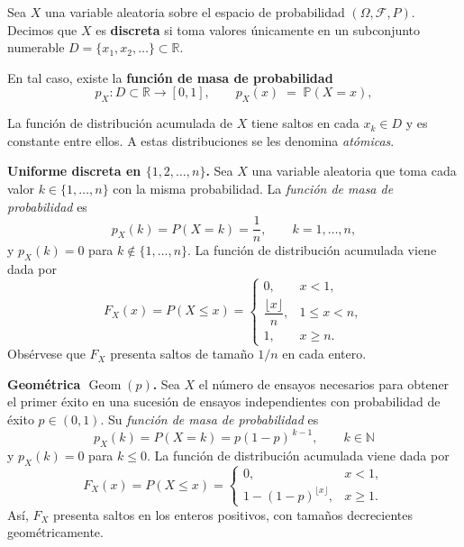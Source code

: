 \documentclass[../Main.tex]{subfiles}
\begin{document}
\begin{definition}{}{}
Sea $X$ una variable aleatoria sobre el espacio de probabilidad
$(\Omega,\mathcal F,P)$.
Decimos que $X$ es \textbf{discreta} si toma valores únicamente en un
subconjunto numerable $D=\{x_1,x_2,\dots\}\subset\mathbb R$.

En tal caso, existe la \textbf{función de masa de probabilidad}
\[
    p_X:D\subset\mathbb R\longrightarrow[0,1],
    \qquad
    p_X(x)\;=\;\mathbb{P}(X=x),
\]

\end{definition}
\begin{remark}{}{}
La función de distribución acumulada de $X$ tiene saltos en cada $x_k\in D$ y es constante entre ellos.  A estas distribuciones se les denomina \emph{atómicas}.
\end{remark}
\begin{example}{}{}
\textbf{Uniforme discreta en \(\{1,2,\dots,n\}\).}\;
Sea \(X\) una variable aleatoria que toma cada valor
\(k\in\{1,\dots,n\}\) con la misma probabilidad.
La \emph{función de masa de probabilidad} es  
\[
    p_X(k)=P(X=k)=\frac{1}{n},
    \qquad k=1,\dots,n,
\]
y \(p_X(k)=0\) para \(k\notin\{1,\dots,n\}\).
La función de distribución acumulada viene dada por
\[
    F_X(x)=P(X\le x)=
    \begin{cases}
        0, & x<1,\\[4pt]
        \dfrac{\lfloor x\rfloor}{n}, & 1\le x<n,\\[10pt]
        1, & x\ge n.
    \end{cases}
\]
Obsérvese que \(F_X\) presenta saltos de tamaño \(1/n\) en cada entero.
\end{example}
\begin{example}{}{}
\textbf{Geométrica \(\operatorname{Geom}(p)\).}\;
Sea \(X\) el número de ensayos necesarios para obtener el primer éxito
en una sucesión de ensayos independientes con probabilidad
de éxito \(p\in(0,1)\).
Su \emph{función de masa de probabilidad} es
\[
    p_X(k)=P(X=k)=p(1-p)^{\,k-1},
    \qquad k\in\mathbb{N}
\]
y \(p_X(k)=0\) para \(k\le 0\).
La función de distribución acumulada viene dada por
\[
    F_X(x)=P(X\le x)=
    \begin{cases}
        0, & x<1,\\[6pt]
        1-(1-p)^{\lfloor x\rfloor}, & x\ge 1.
    \end{cases}
\]
Así, \(F_X\) presenta saltos en los enteros positivos,
con tamaños decrecientes geométricamente.
\end{example}
\end{document}
